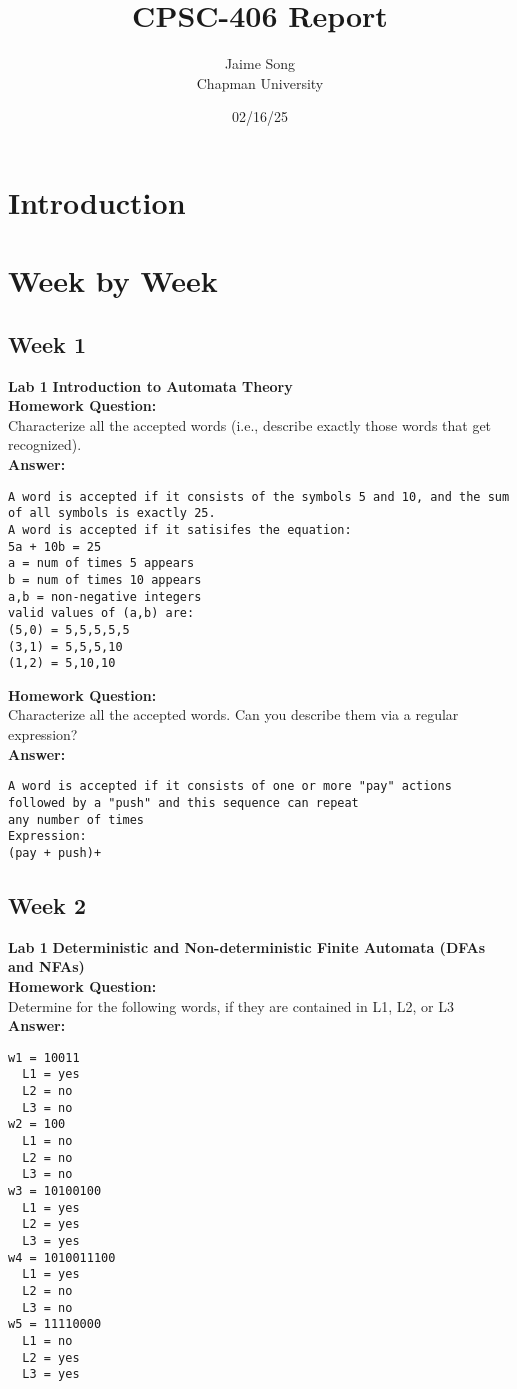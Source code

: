 \documentclass{article}
\title{CPSC-406 Report}
\author{Jaime Song  \\ Chapman University}
\date{02/16/25}
\theoremstyle{theorem}
\theoremstyle{definition}
\theoremstyle{remark}
\begin{document}
\maketitle

\begin{abstract}
\end{abstract}

\setcounter{tocdepth}{3}
\tableofcontents

\section{Introduction}\label{intro}

\section{Week by Week}\label{homework}

\subsection{Week 1}
\textbf{Lab 1}
\textbf{Introduction to Automata Theory} \\
\textbf{Homework Question:} \\
Characterize all the accepted words (i.e., describe exactly those words that get recognized). \\
\textbf{Answer:} 
\begin{lstlisting}
A word is accepted if it consists of the symbols 5 and 10, and the sum of all symbols is exactly 25.
A word is accepted if it satisifes the equation: 
5a + 10b = 25
a = num of times 5 appears
b = num of times 10 appears
a,b = non-negative integers
valid values of (a,b) are:
(5,0) = 5,5,5,5,5
(3,1) = 5,5,5,10
(1,2) = 5,10,10
\end{lstlisting}

\textbf{Homework Question:} \\
Characterize all the accepted words. Can you describe them via a regular expression? \\
\textbf{Answer:} 
\begin{lstlisting}
A word is accepted if it consists of one or more "pay" actions followed by a "push" and this sequence can repeat
any number of times 
Expression: 
(pay + push)+
\end{lstlisting}

\subsection{Week 2}
\textbf{Lab 1}
\textbf{Deterministic and Non-deterministic Finite Automata (DFAs and NFAs)} \\
\textbf{Homework Question:} \\
Determine for the following words, if they are contained in L1, L2, or L3 \\
\textbf{Answer:} 
\begin{lstlisting}
w1 = 10011 
  L1 = yes 
  L2 = no 
  L3 = no 
w2 = 100 
  L1 = no 
  L2 = no
  L3 = no
w3 = 10100100
  L1 = yes
  L2 = yes
  L3 = yes
w4 = 1010011100
  L1 = yes
  L2 = no
  L3 = no
w5 = 11110000
  L1 = no
  L2 = yes
  L3 = yes
\end{lstlisting}
\end{document}
